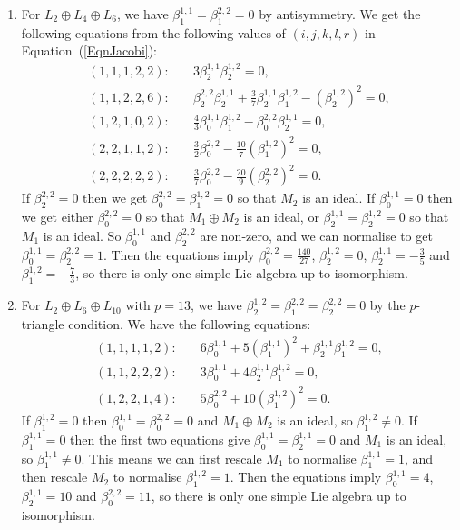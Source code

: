 \documentclass[11pt,a4paper,reqno]{amsart}
\theoremstyle{definition}
\numberwithin{equation}{section}
\begin{document}
\begin{enumerate}
\item For $L_2\oplus L_4\oplus L_6$, we have $\beta^{1,1}_1=\beta^{2,2}_1=0$ by antisymmetry. We get the following equations from the following values of $(i,j,k,l,r)$ in Equation~(\ref{EqnJacobi}):
\begin{align*}
(1,1,1,2,2):\quad&\textstyle 3\beta^{1,1}_2\beta^{1,2}_2=0,\\
(1,1,2,2,6):\quad&\textstyle \beta^{2,2}_2\beta^{1,1}_2+\frac37\beta^{1,1}_2\beta^{1,2}_1-(\beta^{1,2}_2)^2=0,\\
(1,2,1,0,2):\quad&\textstyle \frac43\beta^{1,1}_0\beta^{1,2}_1-\beta^{2,2}_0\beta^{1,1}_2=0,\\
(2,2,1,1,2):\quad&\textstyle \frac32\beta^{2,2}_0-\frac{10}7(\beta^{1,2}_1)^2=0,\\
(2,2,2,2,2):\quad&\textstyle \frac37\beta^{2,2}_0-\frac{20}9(\beta^{2,2}_2)^2=0.
\end{align*}
If $\beta^{2,2}_2=0$ then we get $\beta^{2,2}_0=\beta^{1,2}_1=0$ so that $M_2$ is an ideal. If $\beta^{1,1}_0=0$ then we get either $\beta^{2,2}_0=0$ so that $M_1\oplus M_2$ is an ideal, or $\beta^{1,1}_2=\beta^{1,2}_2=0$ so that $M_1$ is an ideal. So $\beta^{1,1}_0$ and $\beta^{2,2}_2$ are non-zero, and we can normalise to get $\beta^{1,1}_0=\beta^{2,2}_2=1$. Then the equations imply $\beta^{2,2}_0=\frac{140}{27}$, $\beta^{1,2}_2=0$, $\beta^{1,1}_2=-\frac35$ and $\beta^{1,2}_1=-\frac73$, so there is only one simple Lie algebra up to isomorphism.

\item For $L_2\oplus L_6\oplus L_{10}$ with $p=13$, we have $\beta^{1,2}_2=\beta^{2,2}_1=\beta^{2,2}_2=0$ by the $p$-triangle condition. We have the following equations:
\begin{align*}
(1,1,1,1,2):\quad&\textstyle 6\beta^{1,1}_0+5(\beta^{1,1}_1)^2+\beta^{1,1}_2\beta^{1,2}_1=0,\\
(1,1,2,2,2):\quad&\textstyle 3\beta^{1,1}_0+4\beta^{1,1}_2\beta^{1,2}_1=0,\\
(1,2,2,1,4):\quad&\textstyle 5\beta^{2,2}_0+10(\beta^{1,2}_1)^2=0.
\end{align*}
If $\beta^{1,2}_1=0$ then $\beta^{1,1}_0=\beta^{2,2}_0=0$ and $M_1\oplus M_2$ is an ideal, so $\beta^{1,2}_1\neq0$. If $\beta^{1,1}_1=0$ then the first two equations give $\beta^{1,1}_0=\beta^{1,1}_2=0$ and $M_1$ is an ideal, so $\beta^{1,1}_1\neq0$. This means we can first rescale $M_1$ to normalise $\beta^{1,1}_1=1$, and then rescale $M_2$ to normalise $\beta^{1,2}_1=1$. Then the equations imply $\beta^{1,1}_0=4$, $\beta^{1,1}_2=10$ and $\beta^{2,2}_0=11$, so there is only one simple Lie algebra up to isomorphism.


\end{enumerate}
\end{document}
